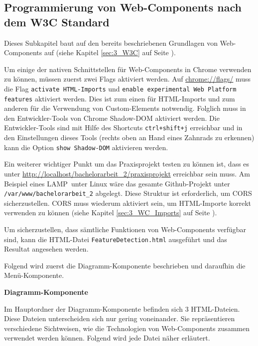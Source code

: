 \subsection{Programmierung von Web-Components nach dem W3C Standard}
\label{sec:6_WC_Pur}

Dieses Subkapitel baut auf den bereits beschriebenen Grundlagen von Web-Components auf (siehe Kapitel \ref{sec:3_W3C} auf Seite \pageref{sec:3_W3C}).

Um einige der nativen Schnittstellen für Web-Components in Chrome verwenden zu können, müssen zuerst zwei Flags aktiviert werden. Auf \url{chrome://flags/} muss die Flag \lstinline|activate HTML-Imports| und \lstinline|enable experimental Web Platform features| aktiviert werden. Dies ist zum einen für HTML-Imports und zum anderen für die Verwendung von Custom-Elements notwendig. Folglich muss in den Entwickler-Tools von Chrome Shadow-DOM aktiviert werden. Die Entwickler-Tools sind mit Hilfe des Shortcuts \lstinline|ctrl+shift+j| erreichbar und in den Einstellungen dieses Tools (rechts oben an Hand eines Zahnrads zu erkennen) kann die Option \lstinline|show Shadow-DOM| aktivieren werden.

Ein weiterer wichtiger Punkt um das Praxisprojekt testen zu können ist, dass es unter \url{http://localhost/bachelorarbeit_2/praxisprojekt} erreichbar sein muss. Am Beispiel eines \glqq LAMP\grqq\ unter Linux wäre das gesamte Github-Projekt unter \lstinline|/var/www/bachelorarbeit_2| abgelegt. Diese Struktur ist erforderlich, um CORS sicherzustellen. CORS muss wiederum  aktiviert sein, um HTML-Importe korrekt verwenden zu können (siehe Kapitel \ref{sec:3_WC_Imports} auf Seite \pageref{sec:3_WC_Imports}).

Um sicherzustellen, dass sämtliche Funktionen von Web-Components verfügbar sind, kann die HTML-Datei \lstinline|FeatureDetection.html| ausgeführt und das Resultat angesehen werden.

Folgend wird zuerst die Diagramm-Komponente beschrieben und daraufhin die Menü-Komponente.

\textbf{Diagramm-Komponente}

Im Hauptordner der Diagramm-Komponente befinden sich 3 HTML-Dateien. Diese Dateien unterscheiden sich nur gering voneinander. Sie repräsentieren verschiedene Sichtweisen, wie die Technologien von Web-Components zusammen verwendet werden können. Folgend wird jede Datei näher erläutert.


